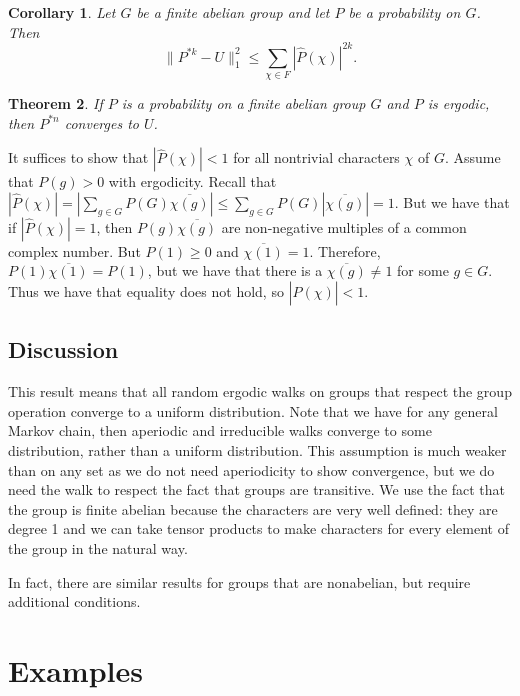\documentclass[]{article}
\newtheorem{theorem}{Theorem}
\newtheorem{corollary}[theorem]{Corollary}
\theoremstyle{definition}
\numberwithin{theorem}{section}
\numberwithin{equation}{section}
\begin{document}
\begin{corollary}
	\label{cor:Convolution Inequality}
	Let $G$ be a finite abelian group and let $P$ be a probability on $G$. Then 
	\begin{equation}
	\|P^{\ast k} - U\|^2_{1} \leq \sum_{\chi \in F} |\widehat{P}(\chi)|^{2k}.
\end{equation}
\end{corollary}

\begin{theorem}
	If $P$ is a probability on a finite abelian group $G$ and $P$ is ergodic, then $P^{\ast n}$ converges to $U$.
\end{theorem}
It suffices to show that $|\widehat{P}(\chi)| < 1$ for all nontrivial characters $\chi$ of $G$. Assume that $P(g) > 0$ with ergodicity. Recall that $|\widehat{P}(\chi)| = |\sum_{g \in G} P(G) \overline{\chi(g)}| \leq \sum_{g \in G} P(G) |\overline{\chi(g)}| = 1$. But we have that if $|\widehat{P}(\chi)| = 1$, then $P(g) \overline{\chi(g)}$ are non-negative multiples of a common complex number. But $P(1) \geq 0$ and $\overline{\chi(1)} = 1$. Therefore, $P(1) \overline{\chi(1)} = P(1)$, but we have that there is a $\overline{\chi(g)} \neq 1$ for some $g \in G$. Thus we have that equality does not hold, so $|\widehat{P}(\chi)| < 1$. 

\subsection{Discussion}
This result means that all random ergodic walks on groups that respect the group operation converge to a uniform distribution. Note that we have for any general Markov chain, then aperiodic and irreducible walks converge to some distribution, rather than a uniform distribution. This assumption is much weaker than on any set as we do not need aperiodicity to show convergence, but we do need the walk to respect the fact that groups are transitive. We use the fact that the group is finite abelian because the characters are very well defined: they are degree 1 and we can take tensor products to make characters for every element of the group in the natural way. 

In fact, there are similar results for groups that are nonabelian, but require additional conditions. 

\section{Examples}\label{Examples}
\end{document}
